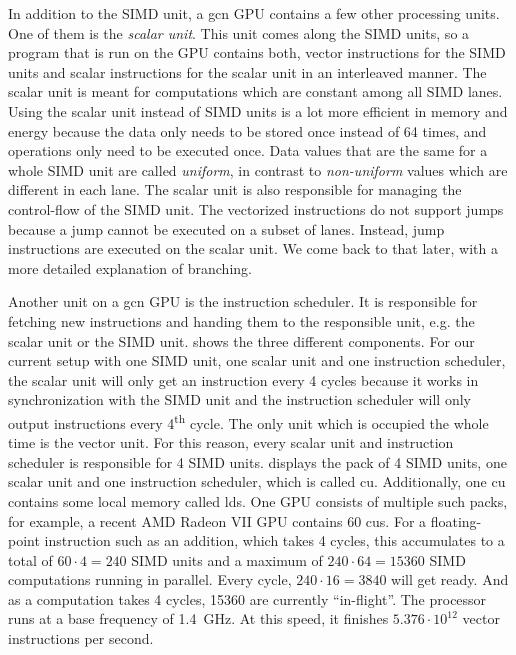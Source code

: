 In addition to the SIMD unit, a \gls{gcn} GPU contains a few other processing units. One of them is the \emph{scalar unit}. This unit comes along the SIMD units, so a program that is run on the GPU contains both, vector instructions for the SIMD units and scalar instructions for the scalar unit in an interleaved manner. The scalar unit is meant for computations which are constant among all SIMD lanes.
Using the scalar unit instead of SIMD units is a lot more efficient in memory and energy because the data only needs to be stored once instead of 64 times, and operations only need to be executed once.
Data values that are the same for a whole SIMD unit are called \emph{uniform}, in contrast to \emph{non-uniform} values which are different in each lane. The scalar unit is also responsible for managing the control-flow of the SIMD unit. The vectorized instructions do not support jumps because a jump cannot be executed on a subset of lanes. Instead, jump instructions are executed on the scalar unit. We come back to that later, with a more detailed explanation of branching.



Another unit on a \gls{gcn} GPU is the instruction scheduler. It is responsible for fetching new instructions and handing them to the responsible unit, e.g. the scalar unit or the SIMD unit.  shows the three different components. For our current setup with one SIMD unit, one scalar unit and one instruction scheduler, the scalar unit will only get an instruction every 4 cycles because it works in synchronization with the SIMD unit and the instruction scheduler will only output instructions every 4\textsuperscript{th} cycle. The only unit which is occupied the whole time is the vector unit. For this reason, every scalar unit and instruction scheduler is responsible for 4 SIMD units.  displays the pack of 4 SIMD units, one scalar unit and one instruction scheduler, which is called \gls{cu}. Additionally, one \gls{cu} contains some local memory called \gls{lds}. One GPU consists of multiple such packs, for example, a recent AMD Radeon VII GPU contains 60 \glspl{cu}. For a floating-point instruction such as an addition, which takes 4 cycles, this accumulates to a total of $60 \cdot 4 = 240$ SIMD units and a maximum of $240 \cdot 64 = 15360$ SIMD computations running in parallel. Every cycle, $240 \cdot 16 = 3840$ will get ready. And as a computation takes 4 cycles, 15360 are currently \enquote{in-flight}.
The processor runs at a base frequency of \SI{1.4}{\giga\hertz}. At this speed, it finishes $5.376 \cdot 10^{12}$ vector instructions per second.

